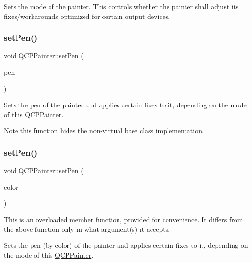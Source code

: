 Sets the mode of the painter. This controls whether the painter shall adjust its fixes/workarounds optimized for certain output devices. \mbox{\label{class_q_c_p_painter_af9c7a4cd1791403901f8c5b82a150195}} 
\subsubsection{\texorpdfstring{set\+Pen()}{setPen()}\hspace{0.1cm}{\footnotesize\ttfamily [1/3]}}
{\footnotesize\ttfamily void Q\+C\+P\+Painter\+::set\+Pen (\begin{DoxyParamCaption}\item[{const Q\+Pen \&}]{pen }\end{DoxyParamCaption})}

Sets the pen of the painter and applies certain fixes to it, depending on the mode of this \hyperlink{class_q_c_p_painter}{Q\+C\+P\+Painter}.

\begin{DoxyNote}{Note}
this function hides the non-\/virtual base class implementation. 
\end{DoxyNote}
\mbox{\label{class_q_c_p_painter_a5c4d88f21564e156e88ef807f7cf0003}} 
\subsubsection{\texorpdfstring{set\+Pen()}{setPen()}\hspace{0.1cm}{\footnotesize\ttfamily [2/3]}}
{\footnotesize\ttfamily void Q\+C\+P\+Painter\+::set\+Pen (\begin{DoxyParamCaption}\item[{const Q\+Color \&}]{color }\end{DoxyParamCaption})}

This is an overloaded member function, provided for convenience. It differs from the above function only in what argument(s) it accepts.

Sets the pen (by color) of the painter and applies certain fixes to it, depending on the mode of this \hyperlink{class_q_c_p_painter}{Q\+C\+P\+Painter}.

